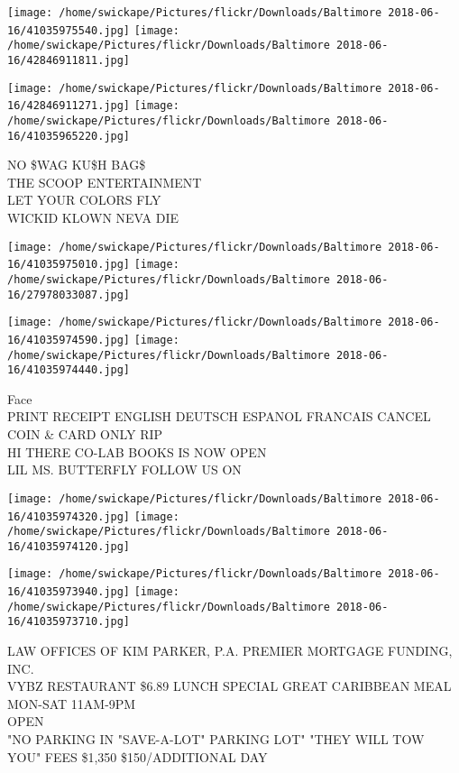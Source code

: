 \documentclass[10pt,letterpaper]{article}
\begin{document}
\texttt{[image: /home/swickape/Pictures/flickr/Downloads/Baltimore 2018-06-16/41035975540.jpg]}
\texttt{[image: /home/swickape/Pictures/flickr/Downloads/Baltimore 2018-06-16/42846911811.jpg]}

\texttt{[image: /home/swickape/Pictures/flickr/Downloads/Baltimore 2018-06-16/42846911271.jpg]}
\texttt{[image: /home/swickape/Pictures/flickr/Downloads/Baltimore 2018-06-16/41035965220.jpg]}

NO \$WAG KU\$H BAG\$\\
THE SCOOP ENTERTAINMENT\\
LET YOUR COLORS FLY\\
WICKID KLOWN NEVA DIE
\pagebreak

\texttt{[image: /home/swickape/Pictures/flickr/Downloads/Baltimore 2018-06-16/41035975010.jpg]}
\texttt{[image: /home/swickape/Pictures/flickr/Downloads/Baltimore 2018-06-16/27978033087.jpg]}

\texttt{[image: /home/swickape/Pictures/flickr/Downloads/Baltimore 2018-06-16/41035974590.jpg]}
\texttt{[image: /home/swickape/Pictures/flickr/Downloads/Baltimore 2018-06-16/41035974440.jpg]}

Face\\
PRINT RECEIPT ENGLISH DEUTSCH ESPANOL FRANCAIS CANCEL COIN \& CARD ONLY RIP\\
HI THERE CO{-}LAB BOOKS IS NOW OPEN\\
LIL MS. BUTTERFLY FOLLOW US ON
\pagebreak

\texttt{[image: /home/swickape/Pictures/flickr/Downloads/Baltimore 2018-06-16/41035974320.jpg]}
\texttt{[image: /home/swickape/Pictures/flickr/Downloads/Baltimore 2018-06-16/41035974120.jpg]}

\texttt{[image: /home/swickape/Pictures/flickr/Downloads/Baltimore 2018-06-16/41035973940.jpg]}
\texttt{[image: /home/swickape/Pictures/flickr/Downloads/Baltimore 2018-06-16/41035973710.jpg]}

LAW OFFICES OF KIM PARKER, P.A. PREMIER MORTGAGE FUNDING, INC.\\
VYBZ RESTAURANT \$6.89 LUNCH SPECIAL GREAT CARIBBEAN MEAL MON{-}SAT 11AM{-}9PM\\
OPEN\\
"NO PARKING IN "SAVE{-}A{-}LOT" PARKING LOT"  "THEY WILL TOW YOU"  FEES \$1,350 \$150/ADDITIONAL DAY
\pagebreak
\end{document}
